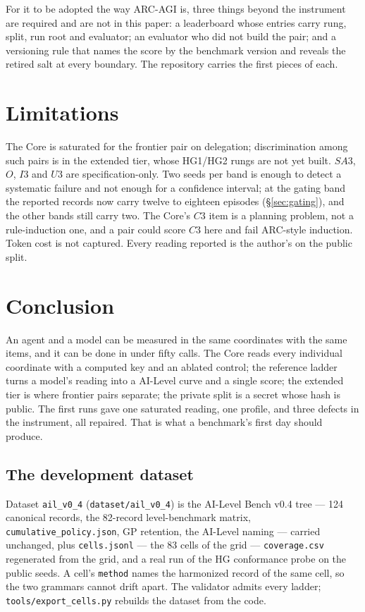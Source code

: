 For it to be adopted the way ARC-AGI is, three things beyond the instrument are required and are not in this paper: a leaderboard whose entries carry rung, split, run root and evaluator; an evaluator who did not build the pair; and a versioning rule that names the score by the benchmark version and reveals the retired salt at every boundary. The repository carries the first pieces of each.

\section{Limitations}\label{sec:limits}

The Core is saturated for the frontier pair on delegation; discrimination among such pairs is in the extended tier, whose HG1/HG2 rungs are not yet built. $SA3$, $O$, $I3$ and $U3$ are specification-only. Two seeds per band is enough to detect a systematic failure and not enough for a confidence interval; at the gating band the reported records now carry twelve to eighteen episodes (\S\ref{sec:gating}), and the other bands still carry two. The Core's $C3$ item is a planning problem, not a rule-induction one, and a pair could score $C3$ here and fail ARC-style induction. Token cost is not captured. Every reading reported is the author's on the public split.

\section{Conclusion}

An agent and a model can be measured in the same coordinates with the same items, and it can be done in under fifty calls. The Core reads every individual coordinate with a computed key and an ablated control; the reference ladder turns a model's reading into a AI-Level curve and a single score; the extended tier is where frontier pairs separate; the private split is a secret whose hash is public. The first runs gave one saturated reading, one profile, and three defects in the instrument, all repaired. That is what a benchmark's first day should produce.

\subsection{The development dataset}\label{sec:devdataset}
Dataset \texttt{ail\_v0\_4} (\texttt{dataset/ail\_v0\_4}) is the AI-Level Bench v0.4 tree --- 124 canonical records, the 82-record level-benchmark matrix, \texttt{cumulative\_policy.json}, GP retention, the AI-Level naming --- carried unchanged, plus \texttt{cells.jsonl} --- the 83 cells of the grid --- \texttt{coverage.csv} regenerated from the grid, and a real run of the HG conformance probe on the public seeds. A cell's \texttt{method} names the harmonized record of the same cell, so the two grammars cannot drift apart. The validator admits every ladder; \texttt{tools/export\_cells.py} rebuilds the dataset from the code.

